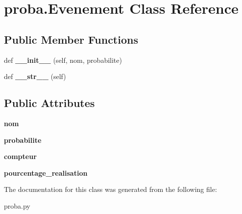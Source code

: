 \hypertarget{classproba_1_1Evenement}{}\section{proba.\+Evenement Class Reference}
\label{classproba_1_1Evenement}
\subsection*{Public Member Functions}
\begin{DoxyCompactItemize}
\item 
def {\bfseries \+\_\+\+\_\+init\+\_\+\+\_\+} (self, nom, probabilite)\hypertarget{classproba_1_1Evenement_adf26b397f3c7dd7da2ef776afa2f4ad0}{}\label{classproba_1_1Evenement_adf26b397f3c7dd7da2ef776afa2f4ad0}

\item 
def {\bfseries \+\_\+\+\_\+str\+\_\+\+\_\+} (self)\hypertarget{classproba_1_1Evenement_af050127b429bf802657b168c83ce1178}{}\label{classproba_1_1Evenement_af050127b429bf802657b168c83ce1178}

\end{DoxyCompactItemize}
\subsection*{Public Attributes}
\begin{DoxyCompactItemize}
\item 
{\bfseries nom}\hypertarget{classproba_1_1Evenement_a648c2517265de40ac3b2cbc103685134}{}\label{classproba_1_1Evenement_a648c2517265de40ac3b2cbc103685134}

\item 
{\bfseries probabilite}\hypertarget{classproba_1_1Evenement_aeac5d19d59ada3a61b70cf4ba7430263}{}\label{classproba_1_1Evenement_aeac5d19d59ada3a61b70cf4ba7430263}

\item 
{\bfseries compteur}\hypertarget{classproba_1_1Evenement_aa6d786e9adbe88999bd16142af924c6a}{}\label{classproba_1_1Evenement_aa6d786e9adbe88999bd16142af924c6a}

\item 
{\bfseries pourcentage\+\_\+realisation}\hypertarget{classproba_1_1Evenement_a3c8adfbb106d9e80eb892b481382bc09}{}\label{classproba_1_1Evenement_a3c8adfbb106d9e80eb892b481382bc09}

\end{DoxyCompactItemize}


The documentation for this class was generated from the following file\+:\begin{DoxyCompactItemize}
\item 
proba.\+py\end{DoxyCompactItemize}
